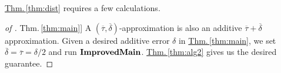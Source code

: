 \documentclass{acmsmall}
\newcommand{\Thm}[1]{\hyperref[thm:#1]{Thm.\,\ref*{thm:#1}}} %
\newcommand{\lis}{{\tt lis}}
\newcommand{\loss}{{\tt loss}}
\newcommand{\deltapar}{\overline{\delta}}
\newcommand{\err}{\xi}
\newcommand{\taupar}{\overline{\tau}}
\newcommand{\eps}{\varepsilon}
\newcommand{\improvedmain}{{\rm {\bf ImprovedMain}}}
\begin{document}

\Thm{dist} requires a few calculations.

\begin{proof}[of \Thm{main}]
A $(\taupar,\deltapar)$-approximation is also an additive $\taupar+\deltapar$ approximation.  Given a desired additive error
$\delta$ in \Thm{main}, we set $\deltapar=\taupar=\delta/2$ and run $\improvedmain$. \Thm{alg2}
gives us the desired guarantee.
\end{proof}
\end{document}
